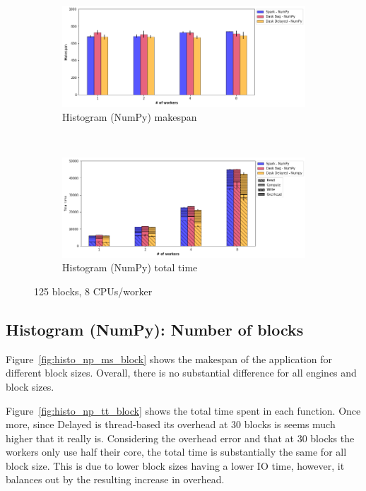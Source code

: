 \documentclass[conference]{IEEEtran}
\begin{document}
\begin{figure}[!b]
    \centering
    \begin{subfigure}[b]{\columnwidth}
        \includegraphics[clip,width=\columnwidth]{images/histo_np_worker.png}%
        \caption{Histogram (NumPy) makespan}\label{fig:histo_np_ms_worker}
    \end{subfigure}
    \\
    \begin{subfigure}[b]{\columnwidth}
        \includegraphics[clip,width=\columnwidth]{images/histo_idle_np_worker.png}%
        \caption{Histogram (NumPy) total time}\label{fig:histo_np_tt_worker}
    \end{subfigure}
    \caption{125 blocks, 8 CPUs/worker}
\end{figure}

\subsection{Histogram (NumPy): Number of blocks}
Figure~\ref{fig:histo_np_ms_block} shows the makespan of the application for
different block sizes. Overall, there is no substantial difference for
all engines and block sizes.

Figure~\ref{fig:histo_np_tt_block} shows the total time spent in each function.
Once more, since Delayed is thread-based its overhead at 30 blocks is seems much
higher that it really is. Considering the overhead error and that at 30 blocks
the workers only use half their core, the total time is substantially the same
for all block size. This is due to lower block sizes having a lower IO time,
however, it balances out by the resulting increase in overhead.
\end{document}
